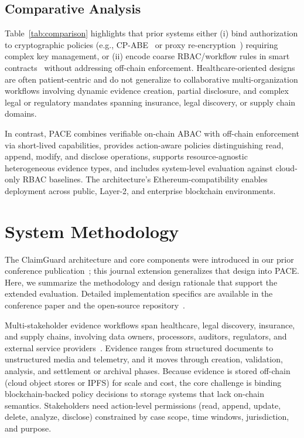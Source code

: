 \documentclass[pdflatex,sn-mathphys-num]{sn-jnl}
\begin{document}
\subsection{Comparative Analysis}

Table~\ref{tab:comparison} highlights that prior systems either (i) bind authorization to cryptographic policies (e.g., CP-ABE~\cite{sun2020insurance} or proxy re-encryption~\cite{liu2021auto}) requiring complex key management, or (ii) encode coarse RBAC/workflow rules in smart contracts~\cite{raikwar2018insurance, tekale2023claims} without addressing off-chain enforcement. Healthcare-oriented designs~\cite{sun2020emr, rana2022healthcare, liang2017mhealth, theodouli2018healthcare} are often patient-centric and do not generalize to collaborative multi-organization workflows involving dynamic evidence creation, partial disclosure, and complex legal or regulatory mandates spanning insurance, legal discovery, or supply chain domains.

In contrast, PACE combines verifiable on-chain ABAC with off-chain enforcement via short-lived capabilities, provides action-aware policies distinguishing read, append, modify, and disclose operations, supports resource-agnostic heterogeneous evidence types, and includes system-level evaluation against cloud-only RBAC baselines. The architecture's Ethereum-compatibility enables deployment across public, Layer-2, and enterprise blockchain environments.


\section{System Methodology}
\label{met}
The ClaimGuard architecture and core components were introduced in our prior conference publication~\cite{eneh2025claimguard}; this journal extension generalizes that design into PACE. Here, we summarize the methodology and design rationale that support the extended evaluation. Detailed implementation specifics are available in the conference paper and the open-source repository~\cite{pace-repo}.

Multi-stakeholder evidence workflows span healthcare, legal discovery, insurance, and supply chains, involving data owners, processors, auditors, regulators, and external service providers~\cite{raghav2024optimizing}. Evidence ranges from structured documents to unstructured media and telemetry, and it moves through creation, validation, analysis, and settlement or archival phases.
Because evidence is stored off-chain (cloud object stores or IPFS) for scale and cost, the core challenge is binding blockchain-backed policy decisions to storage systems that lack on-chain semantics. Stakeholders need action-level permissions (read, append, update, delete, analyze, disclose) constrained by case scope, time windows, jurisdiction, and purpose.
\end{document}
